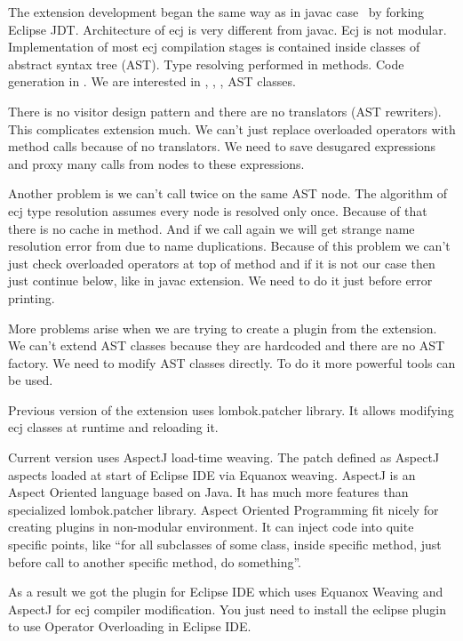 \documentclass{aircc}
\begin{document}
The extension development began the same way as in javac case \textemdash~by forking Eclipse JDT\cite{eclipse.jdt-oo}.
Architecture of ecj is very different from javac. Ecj is not modular.
Implementation of most ecj compilation stages is contained inside classes of abstract syntax tree (AST).
Type resolving performed in  methods.
Code generation in .
We are interested in ,  , ,  AST classes.

There is no visitor design pattern and there are no translators (AST rewriters).
This complicates extension much.
We can't just replace overloaded operators with method calls because of no translators.
We need to save desugared expressions and proxy many calls from nodes to these expressions.

Another problem is we can't call  twice on the same AST node.
The algorithm of ecj type resolution assumes every node is resolved only once.
Because of that there is no cache in  method. 
And if we call  again we will get strange name resolution error from  due to name duplications.
Because of this problem we can't just check overloaded operators at top of  method
and if it is not our case then just continue below, like in javac extension.
We need to do it just before error printing.

More problems arise when we are trying to create a plugin from the extension.
We can't extend AST classes because they are hardcoded and there are no AST factory.
We need to modify AST classes directly. To do it more powerful tools can be used.

Previous version of the extension\cite{lombok-oo} uses lombok.patcher\cite{lombok.patcher} library.
It allows modifying ecj classes at runtime and reloading it.

Current version uses AspectJ load-time weaving\cite{AJLTW}. 
The patch defined as AspectJ aspects loaded at start of Eclipse IDE via Equanox weaving\cite{EquanoxW}.
AspectJ is an Aspect Oriented language based on Java.
It has much more features than specialized lombok.patcher library.
Aspect Oriented Programming fit nicely for creating plugins in non-modular environment.
It can inject code into quite specific points, like ``for all subclasses of some class, inside specific method, just before call to another specific method, do something''.

As a result we got the plugin for Eclipse IDE which uses Equanox Weaving and AspectJ for ecj compiler modification.
You just need to install the eclipse plugin to use Operator Overloading in Eclipse IDE.
\end{document}
